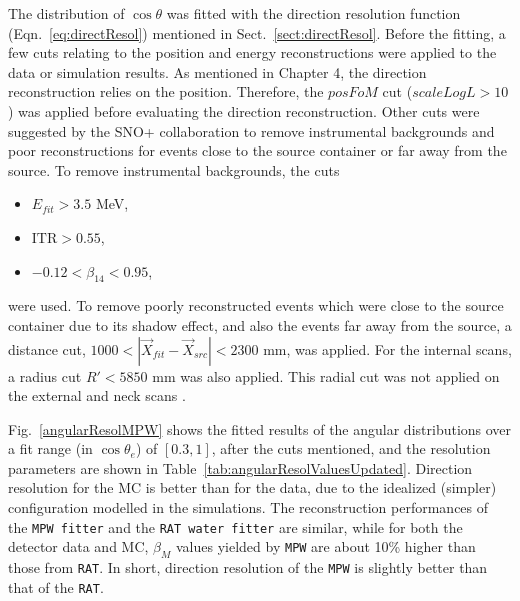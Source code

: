The distribution of $\cos\theta$ was fitted with the direction resolution function (Eqn.~\ref{eq:directResol}) mentioned in Sect.~\ref{sect:directResol}. Before the fitting, a few cuts relating to the position and energy reconstructions were applied to the data or simulation results. As mentioned in Chapter 4, the direction reconstruction relies on the position. Therefore, the $posFoM$ cut ($scaleLogL>10$) was applied before evaluating the direction reconstruction. Other cuts were suggested by the SNO+ collaboration to remove instrumental backgrounds and poor reconstructions for events close to the source container or far away from the source. To remove instrumental backgrounds, the cuts
\begin{itemize}
\item $E_{fit} > 3.5$ MeV\;,
\item $\mathrm{ITR}>0.55$\;,
\item $-0.12<\beta_{14}<0.95$\;,
\end{itemize}
were used. To remove poorly reconstructed events which were close to the source container due to its shadow effect, and also the events far away from the source, a distance cut, $1000<|\vec{X}_{fit}-\vec{X}_{src}|<2300$ mm, was applied. For the internal scans, a radius cut $R'<5850$ mm was also applied. This radial cut was not applied on the external and neck scans \cite{waterunidoc}.

Fig.~\ref{angularResolMPW} shows the fitted results of the angular distributions over a fit range (in $\cos \theta_e$) of $[0.3,1]$, after the cuts mentioned, and the resolution parameters are shown in Table~\ref{tab:angularResolValuesUpdated}. Direction resolution for the MC is better than for the data, due to the idealized (simpler) configuration modelled in the simulations. The reconstruction performances of the \texttt{MPW fitter} and the \texttt{RAT water fitter} are similar, while for both the detector data and MC, $\beta_M$ values yielded by \texttt{MPW} are about 10\% higher than those from \texttt{RAT}. In short, direction resolution of the \texttt{MPW} is slightly better than that of the \texttt{RAT}.

